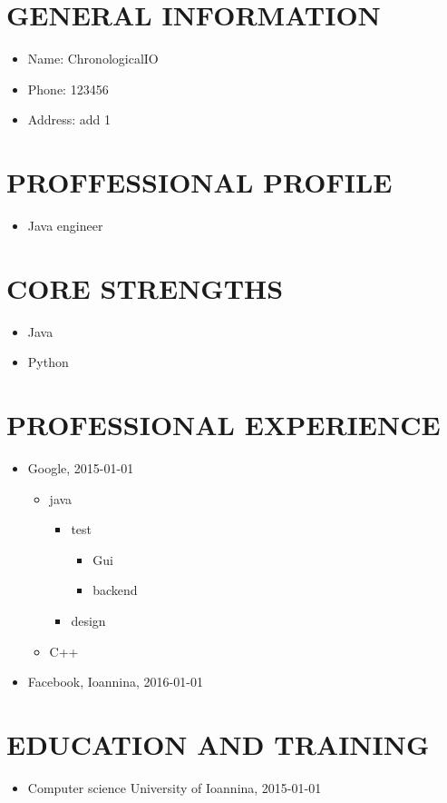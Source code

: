 \documentclass{article}
\begin{document}
 
\section{GENERAL INFORMATION}
\begin{itemize}
\item Name: ChronologicalIO
\item Phone: 123456
\item Address: add 1
\end{itemize}
\section{PROFFESSIONAL PROFILE}
\begin{itemize}
\item Java engineer
\end{itemize}
\section{CORE STRENGTHS}
\begin{itemize}
\item Java
\item Python
\end{itemize}
\section{PROFESSIONAL EXPERIENCE}
\begin{itemize}
\item Google, 2015-01-01
\begin{itemize}
\item java
\begin{itemize}
\item test
\begin{itemize}
\item Gui
\item backend
\end{itemize}
\item design
\end{itemize}
\item C++
\end{itemize}
\item Facebook, Ioannina, 2016-01-01
\end{itemize}
\section{EDUCATION AND TRAINING}
\begin{itemize}
\item Computer science University of Ioannina, 2015-01-01
\end{itemize}
\end{document}
